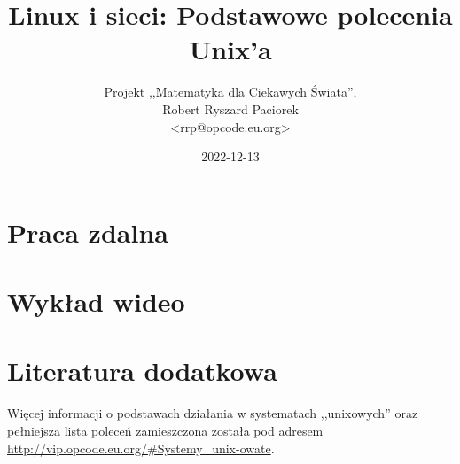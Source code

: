 \documentclass{pdfBooklets}
\title{Linux i sieci: Podstawowe polecenia Unix'a}
\author{%
	Projekt ,,Matematyka dla Ciekawych Świata'',\\
	Robert Ryszard Paciorek\\\normalsize\ttfamily <rrp@opcode.eu.org>
}
\date  {2022-12-13}
\begin{document}
\maketitle






\section{Praca zdalna}









\section{Wykład wideo}




\section{Literatura dodatkowa }


Więcej informacji o podstawach działania w systematach ,,unixowych'' oraz pełniejsza lista poleceń zamieszczona została pod adresem \url{http://vip.opcode.eu.org/#Systemy_unix-owate}.

\ZadaniaRozwiazaniaAuto[norepeat=true]

\end{document}
